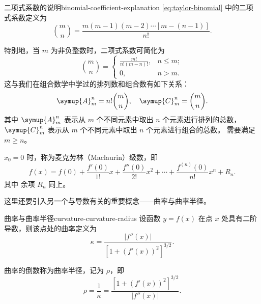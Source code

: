 \begin{note}{二项式系数的说明}{binomial-coefficient-explanation}
    \cref{eq:taylor-binomial} 中的二项式系数定义为
    \begin{equation*}
        \binom{m}{n} = \frac{m (m - 1) (m - 2) \cdots [m - (n - 1)]}{n!} .
    \end{equation*}

    特别地，当 $ m $ 为非负整数时，二项式系数可简化为
    \begin{equation*}
        \binom{m}{n} =
        \begin{cases}
            \frac{m!}{n! (m - n)!}, & n \leq m ; \\
            0,                      & n > m .
        \end{cases}
    \end{equation*}
    这与我们在组合数学中学过的排列数和组合数有如下关系：
    \begin{equation*}
        \symup{A}_m^n = n! \binom{m}{n},\quad \symup{C}_m^n = \binom{m}{n} .
    \end{equation*}
    其中 $ \symup{A}_m^n $ 表示从 $ m $ 个不同元素中取出 $ n $ 个元素进行排列的总数，$ \symup{C}_m^n $ 表示从 $ m $ 个不同元素中取出 $ n $ 个元素进行组合的总数。
    需要满足 $ m \geq n $。
\end{note}

$ x_0 = 0 $ 时，称为麦克劳林（Maclaurin）级数，即
\begin{equation*}
    f(x) = f(0) + \frac{f'(0)}{1!} x + \frac{f''(0)}{2!} x^2 + \cdots + \frac{f^{(n)}(0)}{n!} x^n + R_n.
\end{equation*}
其中 余项 $ R_n $ 同上。

\bigskip

这里还要引入另一个与导数有关的重要概念——曲率与曲率半径。
\begin{definition}{曲率与曲率半径}{curvature-curvature-radius}
    设函数 $ y = f(x) $ 在点 $ x $ 处具有二阶导数，则该点处的曲率定义为
    \begin{equation}
        \kappa = \frac{|f''(x)|}{[1 + (f'(x))^2]^{3/2}}.
    \end{equation}

    曲率的倒数称为曲率半径，记为 $ \rho $，即
    \begin{equation}
        \rho = \frac{1}{\kappa} = \frac{[1 + (f'(x))^2]^{3/2}}{|f''(x)|}.
    \end{equation}

\end{definition}

